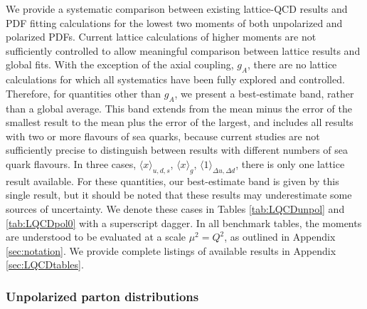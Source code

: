 We provide a systematic comparison between existing
lattice-QCD results and PDF fitting calculations
for the lowest two moments of both unpolarized
and polarized PDFs. Current lattice calculations of higher moments are not sufficiently
controlled to allow meaningful comparison between lattice results and global fits.
With the exception of the axial coupling, $g_A$, there are no lattice calculations
for which all systematics have been fully explored and controlled. Therefore, 
for quantities other than $g_A$, we present a best-estimate band, rather than a global average. This band extends from the mean minus the error of the
smallest result to the mean plus the error of the largest, and includes all results
with two or more flavours of sea quarks, because current studies are not sufficiently
precise to distinguish between results with different numbers of sea quark flavours.
In three cases, $\langle x \rangle_{u,d,s}$, $\langle x \rangle_g$, $\langle 1 \rangle_{\Delta u,\Delta d}$, there is only one
lattice result available. For these quantities, our best-estimate band is given by this single result, but 
it should be noted that these results may underestimate some sources of uncertainty. We denote
these cases in Tables \ref{tab:LQCDunpol} and \ref{tab:LQCDpol0} with a superscript dagger.
In all benchmark tables, the moments are understood to be evaluated at a scale $\mu^2 = Q^2$, as outlined in Appendix 
\ref{sec:notation}. We provide complete listings of available results in Appendix \ref{sec:LQCDtables}.

\subsubsection{Unpolarized parton distributions}

